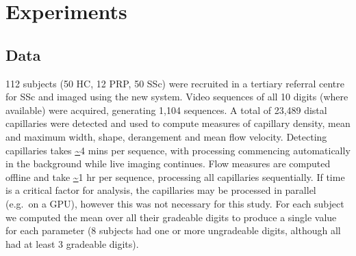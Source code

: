 \documentclass[runningheads,a4paper]{llncs}
\def\eg{e.g.}
\begin{document}
\section{Experiments}
\label{s:experiments}
%
\subsection{Data}
\label{s:data}
112 subjects (50 HC, 12 PRP, 50 SSc) were recruited in a tertiary referral centre for SSc and imaged using the new system. Video sequences of all 10 digits (where available) were acquired, generating 1,104 sequences.  A total of 23,489 distal capillaries were detected and used to compute measures of capillary density, mean and maximum width, shape, derangement and mean flow velocity. Detecting capillaries takes \url{~}4 mins per sequence, with processing commencing automatically in the background while live imaging continues. Flow measures are computed offline and take \url{~}1 hr per sequence, processing all capillaries sequentially.  If time is a critical factor for analysis, the capillaries may be processed in parallel (\eg~on a GPU), however this was not necessary for this study. For each subject we computed the mean over all their gradeable digits to produce a single value for each parameter (8 subjects had one or more ungradeable digits, although all had at least 3 gradeable digits).
%
\end{document}
